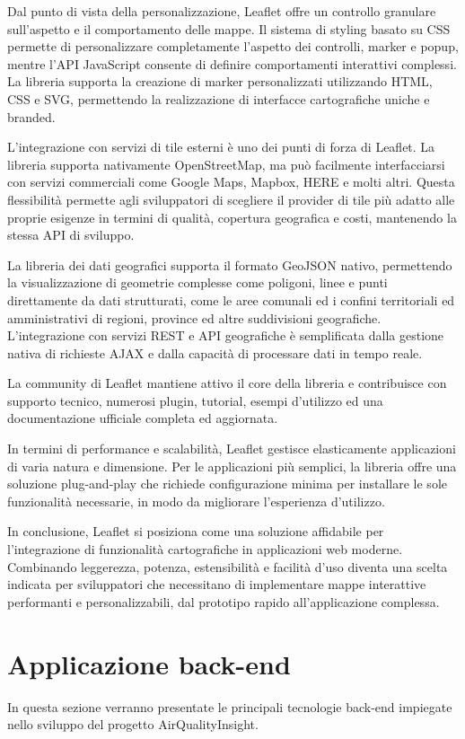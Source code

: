 Dal punto di vista della personalizzazione, Leaflet offre un controllo granulare sull'aspetto e il comportamento delle mappe. Il sistema di styling basato su CSS permette di personalizzare completamente l'aspetto dei controlli, marker e popup, mentre l'API JavaScript consente di definire comportamenti interattivi complessi. La libreria supporta la creazione di marker personalizzati utilizzando HTML, CSS e SVG, permettendo la realizzazione di interfacce cartografiche uniche e branded.

L'integrazione con servizi di tile esterni è uno dei punti di forza di Leaflet. La libreria supporta nativamente OpenStreetMap, ma può facilmente interfacciarsi con servizi commerciali come Google Maps, Mapbox, HERE e molti altri. Questa flessibilità permette agli sviluppatori di scegliere il provider di tile più adatto alle proprie esigenze in termini di qualità, copertura geografica e costi, mantenendo la stessa API di sviluppo.

La libreria dei dati geografici supporta il formato GeoJSON nativo, permettendo la visualizzazione di geometrie complesse come poligoni, linee e punti direttamente da dati strutturati, come le aree comunali ed i confini territoriali ed amministrativi di regioni, province ed altre suddivisioni geografiche. L'integrazione con servizi REST e API geografiche è semplificata dalla gestione nativa di richieste AJAX e dalla capacità di processare dati in tempo reale.

La community di Leaflet mantiene attivo il core della libreria e contribuisce con supporto tecnico, numerosi plugin, tutorial, esempi d'utilizzo ed una documentazione ufficiale completa ed aggiornata.

In termini di performance e scalabilità, Leaflet gestisce elasticamente applicazioni di varia natura e dimensione. Per le applicazioni più semplici, la libreria offre una soluzione plug-and-play che richiede configurazione minima per installare le sole funzionalità necessarie, in modo da migliorare l'esperienza d'utilizzo.

In conclusione, Leaflet si posiziona come una soluzione affidabile per l'integrazione di funzionalità cartografiche in applicazioni web moderne. Combinando leggerezza, potenza, estensibilità e facilità d'uso diventa una scelta indicata per sviluppatori che necessitano di implementare mappe interattive performanti e personalizzabili, dal prototipo rapido all'applicazione complessa.

\section{Applicazione back-end}

In questa sezione verranno presentate le principali tecnologie back-end impiegate nello sviluppo del progetto AirQualityInsight.
